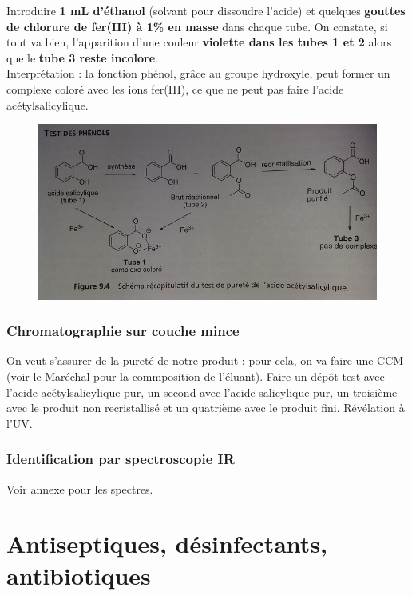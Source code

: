 \documentclass[11pt,a4paper]{report}
\begin{document}
Introduire \textbf{1 mL d'éthanol} (solvant pour dissoudre l'acide) et quelques \textbf{gouttes de chlorure de fer(III) à 1\% en masse} dans chaque tube. On constate, si tout va bien, l'apparition d'une couleur \textbf{violette dans les tubes 1 et 2} alors que le \textbf{tube 3 reste incolore}.\\

Interprétation : la fonction phénol, grâce au groupe hydroxyle, peut former un complexe coloré avec les ions fer(III), ce que ne peut pas faire l'acide acétylsalicylique.

\begin{figure}[h!]
\begin{center}
	\includegraphics[scale = 0.5]{test_phenol.jpg}
	\label{fig:test_phenol}
\end{center}
\end{figure}

\subsubsection{Chromatographie sur couche mince}

On veut s'assurer de la pureté de notre produit : pour cela, on va faire une CCM (voir le Maréchal pour la commposition de l'éluant). Faire un dépôt test avec l'acide acétylsalicylique pur, un second avec l'acide salicylique pur, un troisième avec le produit non recristallisé et un quatrième avec le produit fini. Révélation à l'UV.

\subsubsection{Identification par spectroscopie IR}

Voir annexe pour les spectres.

\section{Antiseptiques, désinfectants, antibiotiques}
\end{document}
